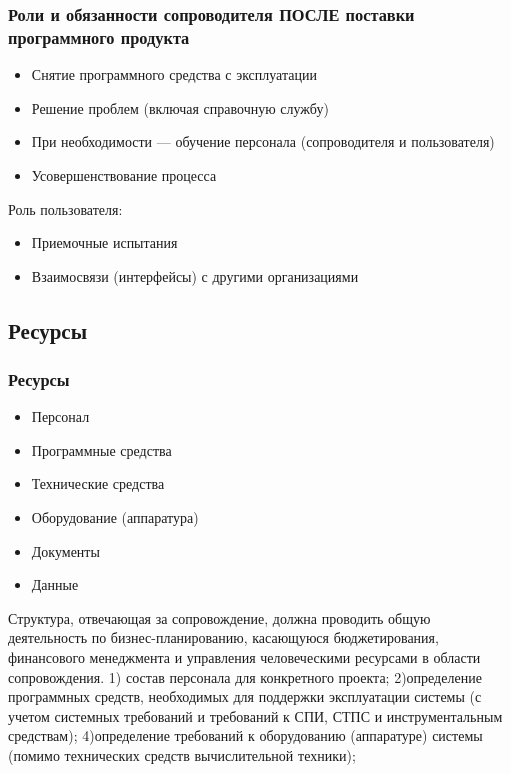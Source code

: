 \documentclass{../industrial-development}
\begin{document}
\lecturenotes

\begin{frame} \frametitle{Роли и обязанности сопроводителя ПОСЛЕ поставки программного продукта}
	\begin{itemize}
		\item Снятие программного средства с эксплуатации 
		\item Решение проблем (включая справочную службу) 
		\item При необходимости — обучение персонала (сопроводителя и пользователя) 
		\item Усовершенствование процесса
	\end{itemize}
	\item Роль пользователя:
	\begin{itemize}
		\item Приемочные испытания  
		\item Взаимосвязи (интерфейсы) с другими организациями
	\end{itemize}
\end{frame}

\lecturenotes


\subsection{Ресурсы}
\begin{frame} \frametitle{Ресурсы}
	\begin{itemize} 
	    \item Персонал
		\item Программные средства 
		\item Технические средства
		\item Оборудование (аппаратура)
		\item Документы
		\item Данные
	\end{itemize}
\end{frame}

\lecturenotes
Структура, отвечающая за сопровождение, должна проводить общую деятельность по бизнес-планированию, касающуюся бюджетирования, финансового менеджмента и управления человеческими ресурсами в области сопровождения. 
1) состав персонала для конкретного проекта;
2)определение программных средств, необходимых для поддержки эксплуатации системы (с учетом системных требований и требований к СПИ, СТПС и инструментальным средствам); 
4)определение требований к оборудованию (аппаратуре) системы (помимо технических средств вычислительной техники); 
\end{document}
